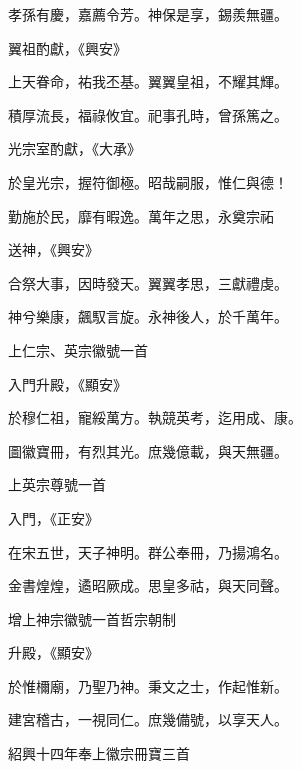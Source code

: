 \begin{pinyinscope}
 孝孫有慶，嘉薦令芳。神保是享，錫羨無疆。



 翼祖酌獻，《興安》



 上天眷命，祐我丕基。翼翼皇祖，不耀其輝。



 積厚流長，福祿攸宜。祀事孔時，曾孫篤之。



 光宗室酌獻，《大承》



 於皇光宗，握符御極。昭哉嗣服，惟仁與德！



 勤施於民，靡有暇逸。萬年之思，永奠宗祏



 送神，《興安》



 合祭大事，因時發天。翼翼孝思，三獻禮虔。



 神兮樂康，飆馭言旋。永神後人，於千萬年。



 上仁宗、英宗徽號一首



 入門升殿，《顯安》



 於穆仁祖，寵綏萬方。執競英考，迄用成、康。



 圖徽寶冊，有烈其光。庶幾億載，與天無疆。



 上英宗尊號一首



 入門，《正安》



 在宋五世，天子神明。群公奉冊，乃揚鴻名。



 金書煌煌，遹昭厥成。思皇多祜，與天同聲。



 增上神宗徽號一首哲宗朝制



 升殿，《顯安》



 於惟檷廟，乃聖乃神。秉文之士，作起惟新。



 建宮稽古，一視同仁。庶幾備號，以享天人。



 紹興十四年奉上徽宗冊寶三首




\end{pinyinscope}
